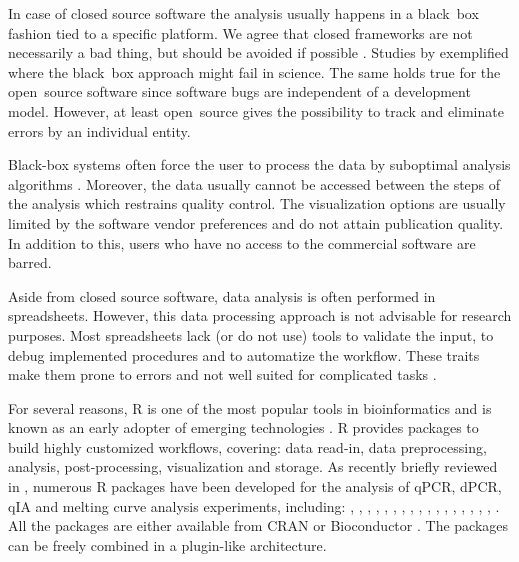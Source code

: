 In case of closed source software the analysis usually happens in a black~box 
fashion tied to a specific platform. We agree that closed frameworks are 
not necessarily a bad thing, but should be avoided if possible 
\citep{roediger_RJ_2013, Spiess_2014}. Studies by \citet{mccullough_2008, 
Almiron_2010, Duran_2014} exemplified where the black~box approach might fail in 
science. The same holds true for the open~source software since software bugs 
are independent of a development model. However, at least open~source gives the 
possibility to track and eliminate errors by an individual entity. 

Black-box systems often force the user to process the data by suboptimal 
analysis algorithms \citep{ruijter_2013}. Moreover, the data usually cannot be 
accessed between the steps of the analysis which restrains quality control. The 
visualization options are usually limited by the software vendor preferences and 
do not attain publication quality. In addition to this, users who have no access 
to the commercial software are barred. 

Aside from closed source software, data analysis is often performed in 
spreadsheets. However, this data processing approach is not advisable for 
research purposes. Most spreadsheets  lack (or do not use) tools to validate the 
input, to debug implemented procedures and to automatize the workflow. These 
traits make them prone to errors and not well suited for complicated tasks 
\citep{mccullough_2008, burns_2014}.

For several reasons, R is one of the most popular tools in bioinformatics and is 
known as an early adopter of emerging technologies \citep{pabinger_2014}. R 
provides packages to build highly customized workflows, covering: data read-in, 
data preprocessing, analysis, post-processing, visualization and storage. As 
recently briefly reviewed in \citet{pabinger_2014}, numerous R packages have 
been developed for the analysis of qPCR, dPCR, qIA and melting curve analysis 
experiments, including: , , 
, , , , 
, , , , 
, , , , 
, , , 
. All the packages are either available from CRAN or 
Bioconductor \citep{gentleman_2004}. The packages can be freely combined in a 
plugin-like architecture.

